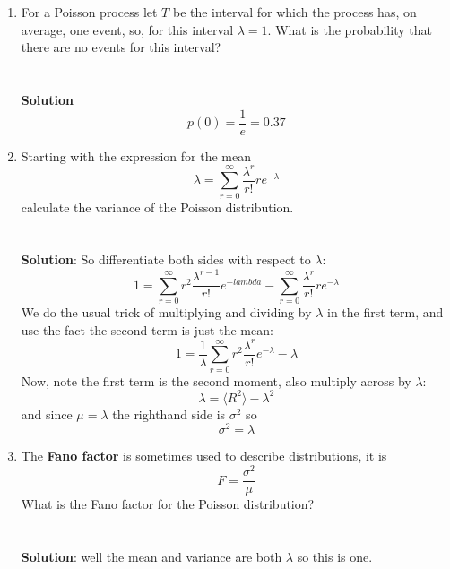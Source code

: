 \documentclass[11pt,a4paper]{scrartcl}
\begin{document}
\begin{enumerate}

\item For a Poisson process let $T$ be the interval for which the
process has, on average, one event, so, for this interval $\lambda=1$. What is the probability that there are no events for this interval?\\ \\ \\  
\textbf{Solution}
\begin{equation}
p(0)=\frac{1}{e}=0.37
\end{equation}

\item Starting with the expression for the mean
  \begin{equation}
    \lambda =\sum_{r=0}^\infty \frac{\lambda^r}{r!}re^{-\lambda}
  \end{equation}
  calculate the variance of the Poisson distribution.\\ \\ \\  
  \textbf{Solution}: So differentiate both sides with respect to $\lambda$:
  \begin{equation}
    1=\sum_{r=0}^\infty r^2 \frac{\lambda^{r-1}}{r!}e^{-lambda}-\sum_{r=0}^\infty \frac{\lambda^r}{r!}re^{-\lambda}
  \end{equation}
  We do the usual trick of multiplying and dividing by $\lambda$ in the first term, and use the fact the second term is just the mean:
  \begin{equation}
    1=\frac{1}{\lambda}\sum_{r=0}^\infty r^2 \frac{\lambda^r}{r!}e^{-\lambda}-\lambda
  \end{equation}
  Now, note the first term is the second moment, also multiply across by $\lambda$:
  \begin{equation}
    \lambda=\langle R^2\rangle-\lambda^2
  \end{equation}
  and since $\mu=\lambda$ the righthand side is $\sigma^2$ so
  \begin{equation}
    \sigma^2=\lambda
  \end{equation}
  
  
\item The \textbf{Fano factor} is sometimes used to describe distributions, it is
  \begin{equation}
    F=\frac{\sigma^2}{\mu}
  \end{equation}
What is the Fano factor for the Poisson distribution?
\\ \\ \\  
\textbf{Solution}: well the mean and variance are both $\lambda$ so this is one.

\end{enumerate}
\end{document}
